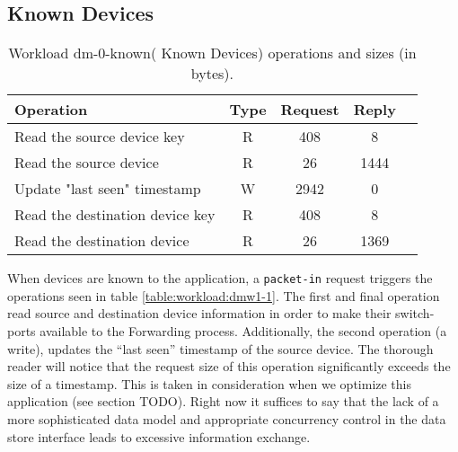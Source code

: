 \documentclass[12pt,openright,twoside]{report}
\begin{document}
\subsection{Known Devices}
\begin{table}[H]
\centering 
\begin{tabular}{l c c c c}
Operation & Type & Request & Reply \\ \toprule 

Read the source device key & R & 408 & 8\\\midrule
Read the source device & R & 26 & 1444\\\midrule
Update "last seen" timestamp & W & 2942 & 0\\\midrule
Read the destination device key & R & 408 & 8\\\midrule
Read the destination device & R & 26 & 1369 \\\bottomrule
\end{tabular}
\caption[Workload dm-0-known( Known Devices) operations]{Workload dm-0-known( Known Devices) operations and sizes (in bytes).}
\end{table}
When devices are known to the application, a \texttt{packet-in} request
triggers the operations seen in table \ref{table:workload:dmw1-1}. The
first and final operation  read source and destination device
information in order to make their switch-ports available to the
Forwarding process. Additionally, the second operation
(a write), updates the ``last seen'' timestamp of the source
device.  The thorough reader will notice that the request size of this
operation significantly exceeds the size of  a timestamp. This is
taken in consideration when we optimize this application (see
section TODO). Right now it suffices to say that the lack of a more
sophisticated data model  and appropriate concurrency control in the
data store interface leads to excessive information exchange. 
\end{document}
